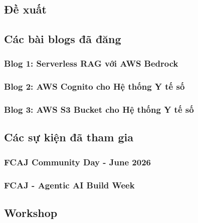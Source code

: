 \newpage

\subsection{Đề xuất}



\newpage

\subsection{Các bài blogs đã đăng}

\subsubsection{Blog 1: Serverless RAG với AWS Bedrock}


\subsubsection{Blog 2: AWS Cognito cho Hệ thống Y tế số}


\subsubsection{Blog 3: AWS S3 Bucket cho Hệ thống Y tế số}


\newpage

\subsection{Các sự kiện đã tham gia}

\subsubsection{FCAJ Community Day - June 2026}


\subsubsection{FCAJ - Agentic AI Build Week}


\newpage

\subsection{Workshop}

